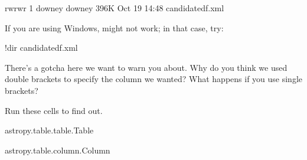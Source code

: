 \documentclass[letterpaper,10pt,english]{sphinxmanual}
\begin{document}
\begin{sphinxVerbatim}[commandchars=\\\{\}]
\PYGZhy{}rw\PYGZhy{}rw\PYGZhy{}r\PYGZhy{}\PYGZhy{} 1 downey downey 396K Oct 19 14:48 candidate\PYGZus{}df.xml
\end{sphinxVerbatim}

If you are using Windows,  might not work; in that case, try:

\begin{sphinxVerbatim}[commandchars=\\\{\}]
!dir candidate\PYGZus{}df.xml
\end{sphinxVerbatim}

 There’s a gotcha here we want to warn you about.  Why do you think we used double brackets to specify the column we wanted?  What happens if you use single brackets?

Run these cells to find out.

\begin{sphinxVerbatim}[commandchars=\\\{\}]
  \PYG{p}{[}\PYG{p}{[}\PYG{p}{]}\PYG{p}{]}
\end{sphinxVerbatim}

\begin{sphinxVerbatim}[commandchars=\\\{\}]
astropy.table.table.Table
\end{sphinxVerbatim}

\begin{sphinxVerbatim}[commandchars=\\\{\}]
  \PYG{p}{[}\PYG{p}{]}
\end{sphinxVerbatim}

\begin{sphinxVerbatim}[commandchars=\\\{\}]
astropy.table.column.Column
\end{sphinxVerbatim}

\begin{sphinxVerbatim}[commandchars=\\\{\}]
\end{sphinxVerbatim}
\end{document}
